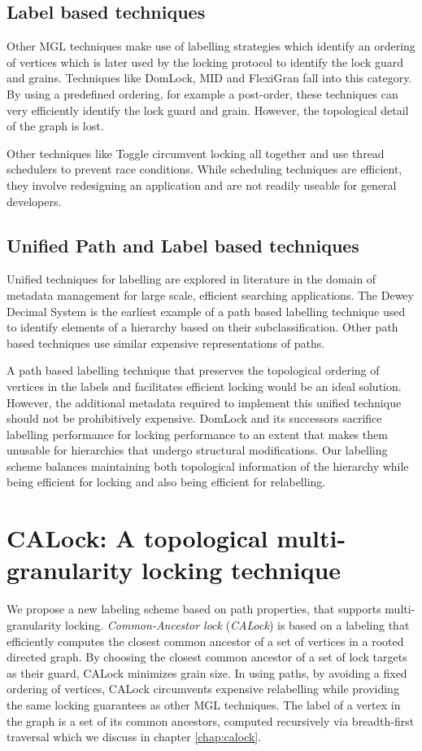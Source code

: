 \subsection{Label based techniques}
Other MGL techniques make use of labelling strategies which identify an ordering of vertices which is later used by the locking protocol to identify the lock guard and grains. Techniques like DomLock, MID and FlexiGran fall into this category. By using a predefined ordering, for example a post-order, these techniques can very efficiently identify the lock guard and grain. However, the topological detail of the graph is lost.  

Other techniques like Toggle \cite{kalikar_toggle_2019} circumvent locking all together and use thread schedulers to prevent race conditions. While scheduling techniques are efficient, they involve redesigning an application and are not readily useable for general developers. 

\subsection{Unified Path and Label based techniques}
Unified techniques for labelling are explored in literature in the domain of metadata management for large scale, efficient searching applications. The Dewey Decimal System \cite{DBLP:journals/jd/Sweeney83} is the earliest example of a path based labelling technique used to identify elements of a hierarchy based on their subclassification. Other path based techniques use similar expensive representations of paths. 

A path based labelling technique that preserves the topological ordering of vertices in the labels and facilitates efficient locking would be an ideal solution. However, the additional metadata required to implement this unified technique should not be prohibitively expensive. DomLock and its successors sacrifice labelling performance for locking performance to an extent that makes them unusable for hierarchies that undergo structural modifications. Our labelling scheme balances maintaining both topological information of the hierarchy while being efficient for locking and also being efficient for relabelling. 

\section{CALock: A topological multi-granularity locking technique}

We propose a new labeling scheme based on path properties, that supports multi-granularity locking. {\em Common-Ancestor lock} ({\em CALock}) is based on a labeling that efficiently computes the closest common ancestor of a set of vertices in a rooted directed graph.
By choosing the closest common ancestor of a set of lock targets as their guard, CALock minimizes grain size. In using paths, by avoiding a fixed ordering of vertices, CALock circumvents expensive relabelling while providing the same locking guarantees as other MGL techniques. The label of a vertex in the graph is a set of its common ancestors, computed recursively via breadth-first traversal which we discuss in chapter \ref{chap:calock}.